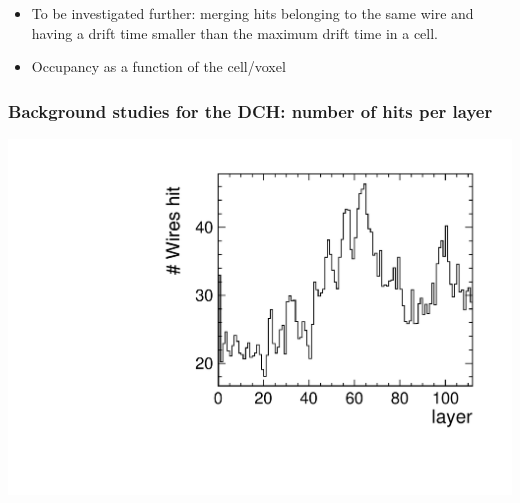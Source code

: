 \documentclass[hyperref={colorlinks=true,pdfpagelabels=false,linkcolor=black}, xcolor=dvipsnames,10pt]{beamer}
\begin{document}
\begin{frame}
\begin{columns}[t]
	\end{columns}
	
	\begin{itemize}
	\item To be investigated further: merging hits belonging to the same wire and having a drift time smaller than the maximum drift time in a cell.
	\item Occupancy as a function of the cell/voxel
	\end{itemize}		
	
\end{frame}

\begin{frame}
	\frametitle{Background studies for the DCH: number of hits per layer}

	
	\centering
	\includegraphics[width=\textwidth]{../figures/DCH/DCH_hits_layer.pdf}
		
	
	
\end{frame}
\end{document}
